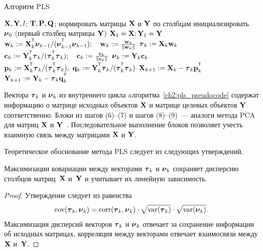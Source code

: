 \begin{algorithm}[h]
	\caption{Алгоритм PLS}
	\label{ch2:pls_pseudocode}
	\begin{algorithmic}[1]
		\REQUIRE $\mathbf{X}, \mathbf{Y}, l$;
		\ENSURE $\mathbf{T}, \mathbf{P}, \mathbf{Q}$;
		\STATE нормировать матрицы $\mathbf{X}$ и $\mathbf{Y}$ по столбцам
		\STATE инициализировать $\boldsymbol{\nu}_0$ (первый столбец матрицы $\mathbf{Y}$)
		\STATE $\mathbf{X}_1 = \mathbf{X}; \mathbf{Y}_1 = \mathbf{Y}$
		\REPEAT
		\vspace{0.1cm}
		\STATE $\bw_k := \bX_k^{\T} \bnu_{k-1} / (\bnu_{k-1}^{\T} \bnu_{k-1}); \quad \bw_k: = \frac{\bw_k}{\| \bw_k \|}$
		\vspace{0.1cm}
		\STATE $\boldsymbol{\tau}_k := \mathbf{X}_k \mathbf{w}_k$
		\vspace{0.1cm}
		\STATE $\bc_k := \bY_k^{\T} \btau_k / (\btau_k^{\T} \btau_k); \quad \bc_k: = \frac{\bc_k}{\| \bc_k \|}$
		\vspace{0.1cm}
		\STATE $\boldsymbol{\nu}_k := \mathbf{Y}_k \mathbf{c}_k$
		\vspace{0.1cm}
		\STATE $\bp_k:= \bX_k^{\T}\btau_k/(\btau_k^{\T}\btau_k),\ 
		\bq_k := \bY_k^{\T}\btau_k/(\btau_k^{\T}\btau_k)$
		\vspace{0.2cm}
		\STATE $\bX_{k+1} :=  \bX_k - \btau_k \bp_k^{\T}$
		\vspace{0.2cm}
		\STATE $\bY_{k + 1} :=  \bY_k - \btau_k \bq_k^{\T}$ 
		\ENDFOR
	\end{algorithmic}
\end{algorithm}

Вектора $\boldsymbol{\tau}_k$ и $\boldsymbol{\nu}_k$ из внутреннего цикла aлгоритма~\ref{ch2:pls_pseudocode}
содержат информацию о матрице исходных объектов $\mathbf{X}$ и матрице целевых объектов $\mathbf{Y}$ соответственно. 
Блоки из шагов (6)--(7) и шагов (8)--(9)~--- аналоги метода PCA для матриц $\mathbf{X}$ и $\mathbf{Y}$~\cite{geladi1988pls}. 
Последовательное выполнение блоков позволяет учесть взаимную связь между матрицами $\mathbf{X}$ и $\mathbf{Y}$.

Теоретическое обоснование метода PLS следует из следующих утверждений.
\begin{statement}
	Максимизации ковариации между векторами $\boldsymbol{\tau}_k$ и $\boldsymbol{\nu}_k$ сохраняет дисперсию столбцов матриц~$\mathbf{X}$ и~$\mathbf{Y}$ и учитывает их линейную зависимость.
\end{statement}
\begin{proof}
	Утверждение следует из равенства
	\[
	\text{cov} (\boldsymbol{\tau}_k, \boldsymbol{\nu}_k) = \text{corr} (\boldsymbol{\tau}_k, \boldsymbol{\nu}_k) \cdot \sqrt{\text{var}(\boldsymbol{\tau}_k)} \cdot \sqrt{\text{var}(\boldsymbol{\nu}_k)}.
	\]
	Максимизация дисперсий векторов $\boldsymbol{\tau}_k$ и $\boldsymbol{\nu}_k$ отвечает за сохранение информации об исходных матрицах, корреляция между векторами отвечает взаимосвязи между $\mathbf{X}$ и~$\mathbf{Y}$. 
\end{proof}

